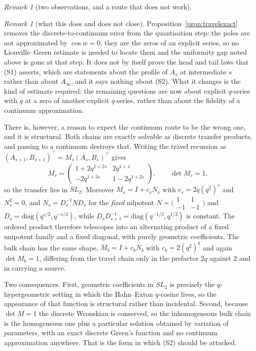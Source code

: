 \documentclass[11pt]{article}
\theoremstyle{definition}
\theoremstyle{remark}
\newtheorem{remark}[theorem]{Remark}
\theoremstyle{definition}
\begin{document}
\begin{remark}[two observations, and a route that does not work]
\begin{remark}[what this does and does not close]\label{rem:exactchain}
Proposition~\ref{prop:travelexact} removes the discrete-to-continuum error from the quantisation
step: the poles are not approximated by $\cos w=0$, they are the zeros of an explicit series, so no
Liouville--Green estimate is needed to locate them and the uniformity gap noted above is gone at
that step. It does not by itself prove the head and tail laws that \textup{(S1)} asserts, which are
statements about the profile of $A_s$ at intermediate $s$ rather than about $A_\infty$, and it says
nothing about \textup{(S2)}. What it changes is the kind of estimate required: the remaining
questions are now about explicit $q$-series with $q$ at a zero of another explicit $q$-series,
rather than about the fidelity of a continuum approximation.
\end{remark}

There is, however, a reason to expect the continuum route to be the wrong one, and it is
structural. Both chains are exactly solvable as discrete transfer products, and passing to a
continuum destroys that. Writing the travel recursion as
$(A_{s+1},B_{s+1})^{\!\top}=M_s(A_s,B_s)^{\!\top}$ gives
\[
   M_s=\begin{pmatrix}1+2q^{1+2s} & 2q^{1+s}\\ -2q^{1+3s} & 1-2q^{1+2s}\end{pmatrix},
   \qquad \det M_s=1 ,
\]
so the transfer lies in $SL_2$. Moreover $M_s=I+c_sN_s$ with $c_s=2q(q^2)^s$ and $N_s^2=0$, and
$N_s=D_s^{-1}ND_s$ for the \emph{fixed} nilpotent $N=\bigl(\begin{smallmatrix}1&1\\-1&-1
\end{smallmatrix}\bigr)$ and $D_s=\mathrm{diag}(q^{s/2},q^{-s/2})$, while
$D_sD_{s+1}^{-1}=\mathrm{diag}(q^{-1/2},q^{1/2})$ is constant. The ordered product therefore
telescopes into an alternating product of a fixed unipotent family and a fixed diagonal, with
purely geometric coefficients. The bulk chain has the same shape,
$M_b=I+c_bN_b$ with $c_b=2(q^2)^b$ and again $\det M_b=1$, differing from the travel chain only
in the prefactor $2q$ against $2$ and in carrying a source.

Two consequences. First, geometric coefficients in $SL_2$ is precisely the $q$-hypergeometric
setting in which the Hahn--Exton $q$-cosine lives, so the appearance of that function is
structural rather than incidental. Second, because $\det M=1$ the discrete Wronskian is conserved,
so the inhomogeneous bulk chain is the homogeneous one plus a particular solution obtained by
variation of parameters, with an exact discrete Green's function and no continuum approximation
anywhere. That is the form in which \textup{(S2)} should be attacked.


\end{remark}
\end{document}
